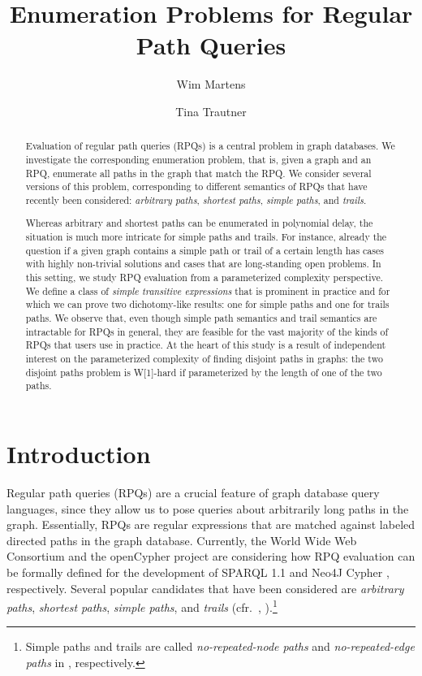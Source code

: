 \documentclass[a4paper,english]{lipics-v2016}
\theoremstyle{plain}
\begin{document}
\title{Enumeration Problems for Regular Path Queries}




\author[1]{Wim Martens}
\author[1]{Tina Trautner}



\maketitle
\begin{abstract}
  Evaluation of regular path queries (RPQs) is a central problem in graph
  databases. We investigate the corresponding enumeration problem, 
  that is, given a graph and an RPQ, enumerate all paths in the graph
  that match the RPQ. We consider several versions of this problem,
  corresponding to different semantics of RPQs that have recently been
  considered: \emph{arbitrary paths}, \emph{shortest paths},
  \emph{simple paths}, and \emph{trails}. 

  Whereas arbitrary and shortest paths can be enumerated in polynomial
  delay, the situation is much more intricate for simple paths and
  trails. For instance, already the question if a given graph contains
  a simple path or trail of a certain length has cases
  with highly non-trivial solutions and cases that are long-standing
  open problems. In this setting, we study RPQ evaluation from a
  parameterized complexity perspective. We define a class of
  \emph{simple transitive expressions} that is prominent in practice
  and for which we can prove two dichotomy-like results: one for
  simple paths and one for trails paths. We observe
  that, even though simple path semantics and trail semantics are
  intractable for RPQs in general, they are feasible for the vast
  majority of the kinds of RPQs that users use in practice.  At the
  heart of this study is a result of independent interest on the
  parameterized complexity of finding disjoint 
  paths in graphs:
  the two disjoint paths problem is W[1]-hard if parameterized by the
  length of one of the two paths.
\end{abstract}

\makeatletter{}\section{Introduction}

Regular path queries (RPQs) are a crucial feature of graph database
query languages, since they allow us to pose queries about arbitrarily
long paths in the graph. Essentially, RPQs are regular expressions
that are matched against labeled directed paths in the graph
database. Currently, the World Wide Web Consortium \cite{w3c} and the
openCypher project \cite{opencypher} are considering how RPQ
evaluation can be formally defined for the development of SPARQL 1.1
\cite{w3c-sparql11} and Neo4J Cypher \cite{cypher,CIP17},
respectively. Several popular candidates that have been considered are
\emph{arbitrary paths}, \emph{shortest paths}, \emph{simple paths},
and \emph{trails}
(cfr.~\cite[Section 4.5]{pablo}, \cite{CIP17}).\footnote{Simple paths
  and trails 
  are called \emph{no-repeated-node paths} and \emph{no-repeated-edge
    paths} in \cite[Section
   4.5]{pablo}, respectively.}
\end{document}
